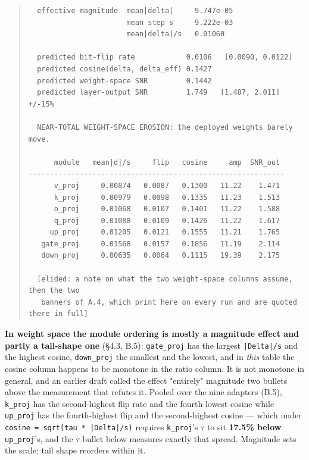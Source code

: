 \begin{quote}\tiny\begin{verbatim}
  effective magnitude  mean|delta|     9.747e-05
                       mean step s     9.222e-03
                       mean|delta|/s   0.01060

  predicted bit-flip rate            0.0106   [0.0090, 0.0122]
  predicted cosine(delta, delta_eff) 0.1427
  predicted weight-space SNR         0.1442
  predicted layer-output SNR         1.749   [1.487, 2.011]  +/-15%

  NEAR-TOTAL WEIGHT-SPACE EROSION: the deployed weights barely move.

      module   mean|d|/s     flip   cosine     amp  SNR_out
------------------------------------------------------------
      v_proj     0.00874   0.0087   0.1300   11.22    1.471
      k_proj     0.00979   0.0098   0.1335   11.23    1.513
      o_proj     0.01068   0.0107   0.1401   11.22    1.588
      q_proj     0.01088   0.0109   0.1426   11.22    1.617
     up_proj     0.01205   0.0121   0.1555   11.21    1.765
   gate_proj     0.01568   0.0157   0.1856   11.19    2.114
   down_proj     0.00635   0.0064   0.1115   19.39    2.175

  [elided: a note on what the two weight-space columns assume, then the two
   banners of A.4, which print here on every run and are quoted there in full]
\end{verbatim}\end{quote}

\textbf{In weight space the module ordering is mostly a magnitude effect and partly a tail-shape one} (\S{}4.3, B.5): \texttt{gate\_\allowbreak{}proj} has the largest \texttt{|Delta|/\allowbreak{}s} and the highest cosine, \texttt{down\_\allowbreak{}proj} the smallest and the lowest, and in \emph{this} table the cosine column happens to be monotone in the ratio column. It is not monotone in general, and an earlier draft called the effect "entirely" magnitude two bullets above the measurement that refutes it. Pooled over the nine adapters (B.5), \texttt{k\_\allowbreak{}proj} has the second-highest flip rate and the fourth-lowest cosine while \texttt{up\_\allowbreak{}proj} has the fourth-highest flip and the second-highest cosine --- which under \texttt{cosine = sqrt(tau * |Delta|/\allowbreak{}s)} requires \texttt{k\_\allowbreak{}proj}'s $\tau$ to sit \textbf{17.5\% below} \texttt{up\_\allowbreak{}proj}'s, and the $\tau$ bullet below measures exactly that spread. Magnitude sets the scale; tail shape reorders within it.

